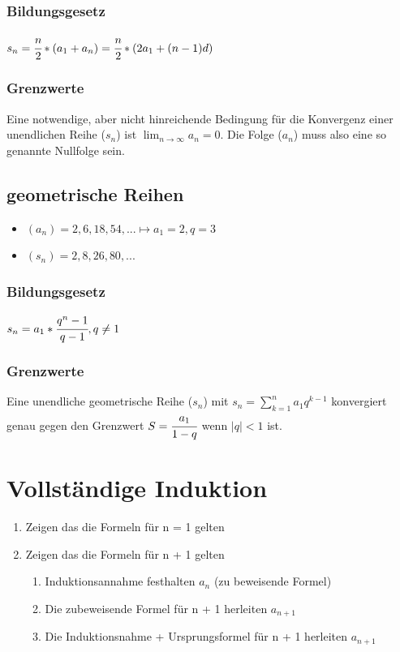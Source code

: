 \documentclass[a4paper,12pt]{scrartcl}
\begin{document}
\subsubsection{Bildungsgesetz}
$s_n = \cfrac{n}{2} * (a_1 + a_n) = \cfrac{n}{2} * (2a_1 + (n - 1)d)$

\subsubsection{Grenzwerte}
Eine notwendige, aber nicht hinreichende Bedingung für die Konvergenz einer unendlichen Reihe ($s_n$) ist  	$\lim_{n \to \infty} a_n = 0$. Die Folge ($a_n$) muss also eine so genannte Nullfolge sein. 

\subsection{geometrische Reihen}
\begin{itemize}
\item $(a_n) = 2, 6, 18, 54, ... \mapsto a_1 = 2, q = 3$ 
\item $(s_n) = 2, 8, 26, 80, ...$
\end{itemize}

\subsubsection{Bildungsgesetz}
$s_n = a_1 * \cfrac{q^n - 1}{q - 1}, q \ne 1$

\subsubsection{Grenzwerte}
Eine unendliche geometrische Reihe ($s_n$) mit $s_n = \sum\limits_{k=1}^n a_1 q^{k-1}$ konvergiert genau gegen den Grenzwert $S=\cfrac{a_1}{1-q}$ wenn $|q| < 1$ ist.

\newpage
\section{Vollständige Induktion}
\begin{enumerate}
\item Zeigen das die Formeln für n = 1 gelten
\item Zeigen das die Formeln für n + 1 gelten
\begin{enumerate}
\item Induktionsannahme festhalten $a_n$ (zu beweisende Formel)
\item Die zubeweisende Formel für n + 1 herleiten $a_{n+1}$
\item Die Induktionsnahme + Ursprungsformel für n + 1 herleiten $a_{n+1}$
\end{enumerate}
\end{enumerate}
\end{document}
